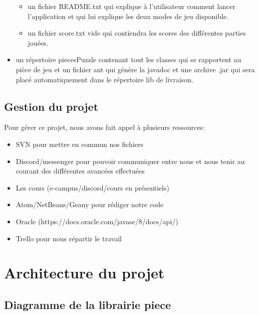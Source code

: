 \documentclass[12pt]{article}
\begin{document}
\begin{small}
\begin{itemize}
\begin{itemize}
		\item un fichier README.txt qui explique à l'utilisateur comment lancer l'application et qui lui explique les deux modes de jeu disponible.
		\item un fichier score.txt vide qui contiendra les scores des différentes parties jouées. 
	\end{itemize}
	\item un répertoire piecesPuzzle contenant tout les classes qui se rapportent au pièce de jeu et un fichier ant qui génère la javadoc et une archive .jar qui sera placé automatiquement dans le répertoire lib de livraison.
\end{itemize}
\end{small}

\subsection{Gestion du projet}

Pour gérer ce projet, nous avons fait appel à plusieurs ressources: 
\begin{small}
\begin{itemize}
	\item SVN pour mettre en commun nos fichiers 
	\item Discord/messenger pour pouvoir communiquer entre nous et nous tenir au courant des différentes avancées effectuées
	\item Les cours (e-campus/discord/cours en présentiels) 
	\item Atom/NetBeans/Geany pour rédiger notre code
	\item Oracle (https://docs.oracle.com/javase/8/docs/api/)
	\item Trello pour nous répartir le travail
\end{itemize}
\end{small}
\section{Architecture du projet}

\subsection{Diagramme de la librairie piece}
\end{document}
